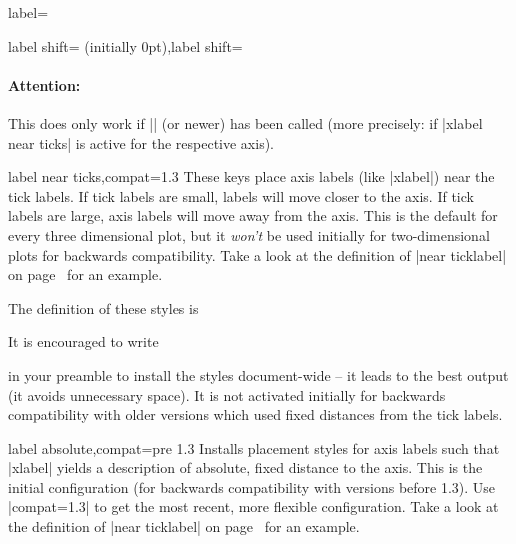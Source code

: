 \begin{pgfplotsxykey}{\x label=}
\begin{pgfplotsxykeylist}{%
        \x label shift= (initially 0pt),label shift=%
    }
        \paragraph{Attention:}

        This does only work if |\pgfplotsset{compat=1.3}| (or newer) has been
        called (more precisely: if |xlabel near ticks| is active for the
        respective axis).
    \end{pgfplotsxykeylist}

    \begin{pgfplotsxykeylist}{\x label near ticks,compat=1.3}
        These keys place axis labels (like |xlabel|) near the tick labels. If
        tick labels are small, labels will move closer to the axis. If tick
        labels are large, axis labels will move away from the axis. This is the
        default for every three dimensional plot, but it \emph{won't} be used
        initially for two-dimensional plots for backwards compatibility. Take a
        look at the definition of |near ticklabel| on
        page~\pageref{key:near:ticklabel} for an example.

        The definition of these styles is
\begin{codeexample}
\end{codeexample}

        It is encouraged to write
\begin{codeexample}
\pgfplotsset{compat=1.3} %
\end{codeexample}
        \noindent in your preamble to install the styles document-wide -- it
        leads to the best output (it avoids unnecessary space). It is not
        activated initially for backwards compatibility with older versions
        which used fixed distances from the tick labels.
    \end{pgfplotsxykeylist}

    \begin{pgfplotsxykeylist}{\x label absolute,compat=pre 1.3}
        Installs placement styles for axis labels such that |xlabel| yields a
        description of absolute, fixed distance to the axis. This is the
        initial configuration (for backwards compatibility with versions before
        1.3). Use |compat=1.3| to get the most recent, more flexible
        configuration. Take a look at the definition of |near ticklabel| on
        page~\pageref{key:near:ticklabel} for an example.


\end{pgfplotsxykeylist}
\end{pgfplotsxykey}
